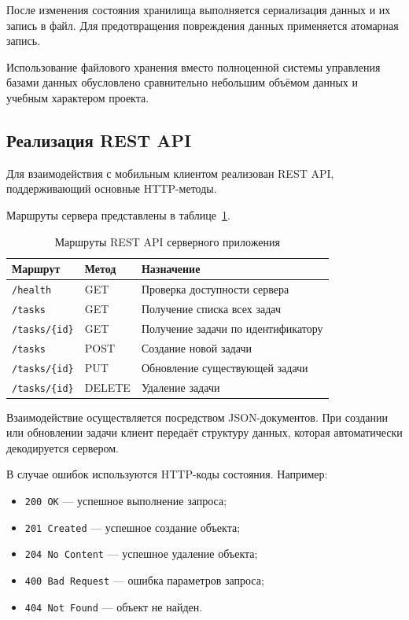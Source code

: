 \documentclass[14pt,a4paper]{extarticle}
\begin{document}
После изменения состояния хранилища выполняется сериализация данных и их запись в файл. Для предотвращения повреждения данных применяется атомарная запись.

Использование файлового хранения вместо полноценной системы управления базами данных обусловлено сравнительно небольшим объёмом данных и учебным характером проекта.

\subsection{Реализация REST API}

Для взаимодействия с мобильным клиентом реализован REST API, поддерживающий основные HTTP-методы.

Маршруты сервера представлены в таблице~\ref{table:server_api}.

\begin{table}[H]
\centering
\caption{Маршруты REST API серверного приложения}
\label{table:server_api}
\begin{tabular}{|p{3cm}|p{2cm}|p{8cm}|}
\hline
\textbf{Маршрут} & \textbf{Метод} & \textbf{Назначение} \\
\hline
\texttt{/health} & GET & Проверка доступности сервера \\
\hline
\texttt{/tasks} & GET & Получение списка всех задач \\
\hline
\texttt{/tasks/\{id\}} & GET & Получение задачи по идентификатору \\
\hline
\texttt{/tasks} & POST & Создание новой задачи \\
\hline
\texttt{/tasks/\{id\}} & PUT & Обновление существующей задачи \\
\hline
\texttt{/tasks/\{id\}} & DELETE & Удаление задачи \\
\hline
\end{tabular}
\end{table}

Взаимодействие осуществляется посредством JSON-документов. При создании или обновлении задачи клиент передаёт структуру данных, которая автоматически декодируется сервером.

В случае ошибок используются HTTP-коды состояния. Например:

\begin{itemize}
    \item \texttt{200 OK} --- успешное выполнение запроса;
    \item \texttt{201 Created} --- успешное создание объекта;
    \item \texttt{204 No Content} --- успешное удаление объекта;
    \item \texttt{400 Bad Request} --- ошибка параметров запроса;
    \item \texttt{404 Not Found} --- объект не найден.
\end{itemize}
\end{document}
